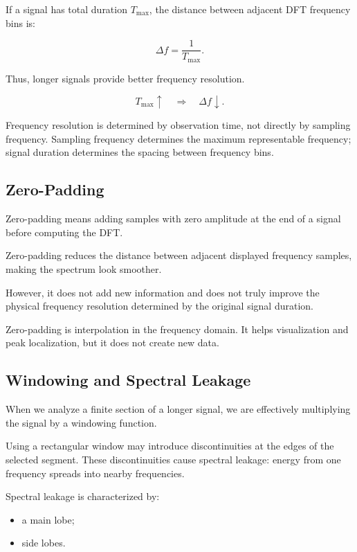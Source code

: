 If a signal has total duration $T_{\max}$, the distance between adjacent DFT frequency bins is:

\[
\Delta f =
\frac{1}{T_{\max}}.
\]

Thus, longer signals provide better frequency resolution.

\[
T_{\max} \uparrow
\quad \Rightarrow \quad
\Delta f \downarrow.
\]

\begin{authornote}
Frequency resolution is determined by observation time, not directly by sampling frequency. Sampling frequency determines the maximum representable frequency; signal duration determines the spacing between frequency bins.
\end{authornote}

\subsection{Zero-Padding}

Zero-padding means adding samples with zero amplitude at the end of a signal before computing the DFT.

Zero-padding reduces the distance between adjacent displayed frequency samples, making the spectrum look smoother.

However, it does not add new information and does not truly improve the physical frequency resolution determined by the original signal duration.

\begin{authornote}
Zero-padding is interpolation in the frequency domain. It helps visualization and peak localization, but it does not create new data.
\end{authornote}

\subsection{Windowing and Spectral Leakage}

When we analyze a finite section of a longer signal, we are effectively multiplying the signal by a windowing function.

Using a rectangular window may introduce discontinuities at the edges of the selected segment. These discontinuities cause spectral leakage: energy from one frequency spreads into nearby frequencies.

Spectral leakage is characterized by:

\begin{itemize}[noitemsep]
    \item a main lobe;
    \item side lobes.
\end{itemize}

